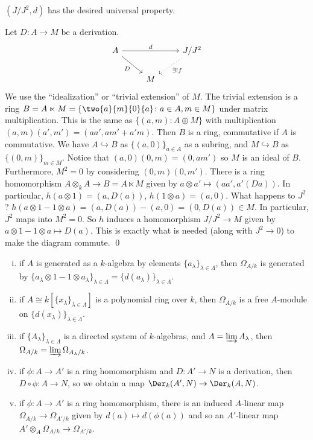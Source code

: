 \begin{prop}
$(J/J^2,d)$ has the desired universal property. 
\end{prop}

\pf Let $D: A \to M$ be a derivation.
	\[
	\begin{tikzcd}
	A \arrow{rr}{d} \arrow[swap]{dr}{D} & & J/J^2 \arrow[dotted]{dl}{\exists! f} \\
	& M & 
	\end{tikzcd}
	\]
We use the ``idealization'' or ``trivial extension'' of $M$. The trivial extension is a ring $B= A \ltimes M= \left\{ \two{a}{m}{0}{a} \colon a \in A, m \in M \right\}$ under matrix multiplication. This is the same as $\{ (a,m) \colon A \oplus M \}$ with multiplication $(a,m)(a',m')= (aa',am'+a'm)$. Then $B$ is a ring, commutative if $A$ is commutative. We have $A \hookrightarrow B$ as $\{(a,0)\}_{a \in A}$ as a subring, and $M \hookrightarrow B$ as $\{(0,m)\}_{m \in M}$. Notice that $(a,0)(0,m)= (0,am')$ so $M$ is an ideal of $B$. Furthermore, $M^2=0$ by considering $(0,m)(0,m')$. There is a ring homomorphism $A \otimes_k A \to B= A \ltimes M$ given by $a \otimes a' \mapsto (aa', a'(Da))$. In particular, $h(a \otimes 1) = (a, D(a))$, $h(1 \otimes a) = (a,0)$. What happens to $J^2$? $h(a \otimes 1 - 1 \otimes a)= (a,D(a)) - (a,0)= (0,D(a)) \in M$. In particular, $J^2$ maps into $M^2=0$. So $h$ induces a homomorphism $J/J^2 \to M$ given by $a \otimes 1 - 1 \otimes a \mapsto D(a)$. This is exactly what is needed (along with $J^2 \to 0$) to make the diagram commute. \qed \\


\begin{prop} \hfill
\begin{enumerate}[(i)]
\item if $A$ is generated as a $k$-algebra by elements $\{a_\lambda\}_{\lambda \in \Lambda}$, then $\Omega_{A/k}$ is generated by $\{ a_\lambda \otimes 1 - 1 \otimes a_\lambda\}_{\lambda \in \Lambda}= \{d(a_\lambda)\}_{\lambda \in \Lambda}$. 
\item if $A \cong k[\{x_\lambda\}_{\lambda \in \Lambda}]$ is a polynomial ring over $k$, then $\Omega_{A/k}$ is a free $A$-module on $\{d(x_\lambda) \}_{\lambda \in \Lambda}$. 
\item if $\{A_\lambda\}_{\lambda \in \Lambda}$ is a directed system of $k$-algebras, and $A = \varinjlim A_\lambda$, then $\Omega_{A/k} = \varinjlim \Omega_{A_\lambda/k}$. 
\item if $\phi: A \to A'$ is a ring homomorphism and $D: A' \to N$ is a derivation, then $D \circ \phi: A \to N$, so we obtain a map $\Der_k(A',N) \to \Der_k(A,N)$.
\item if $\phi: A \to A'$ is a ring homomorphism, there is an induced $A$-linear map $\Omega_{A/k} \to \Omega_{A'/k}$ given by $d(a) \mapsto d(\phi(a))$ and so an $A'$-linear map $A' \otimes_A \Omega_{A/k} \to \Omega_{A'/k}$. 
\end{enumerate}
\end{prop}


